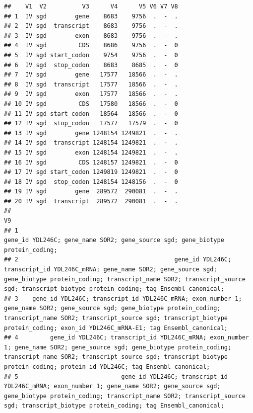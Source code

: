 \documentclass[
]{book}
\begin{document}
\begin{verbatim}
##    V1  V2          V3      V4      V5 V6 V7 V8
## 1  IV sgd        gene    8683    9756  .  -  .
## 2  IV sgd  transcript    8683    9756  .  -  .
## 3  IV sgd        exon    8683    9756  .  -  .
## 4  IV sgd         CDS    8686    9756  .  -  0
## 5  IV sgd start_codon    9754    9756  .  -  0
## 6  IV sgd  stop_codon    8683    8685  .  -  0
## 7  IV sgd        gene   17577   18566  .  -  .
## 8  IV sgd  transcript   17577   18566  .  -  .
## 9  IV sgd        exon   17577   18566  .  -  .
## 10 IV sgd         CDS   17580   18566  .  -  0
## 11 IV sgd start_codon   18564   18566  .  -  0
## 12 IV sgd  stop_codon   17577   17579  .  -  0
## 13 IV sgd        gene 1248154 1249821  .  -  .
## 14 IV sgd  transcript 1248154 1249821  .  -  .
## 15 IV sgd        exon 1248154 1249821  .  -  .
## 16 IV sgd         CDS 1248157 1249821  .  -  0
## 17 IV sgd start_codon 1249819 1249821  .  -  0
## 18 IV sgd  stop_codon 1248154 1248156  .  -  0
## 19 IV sgd        gene  289572  290081  .  -  .
## 20 IV sgd  transcript  289572  290081  .  -  .
##                                                                                                                                                                                                                                                             V9
## 1                                                                                                                                                                               gene_id YDL246C; gene_name SOR2; gene_source sgd; gene_biotype protein_coding;
## 2                                            gene_id YDL246C; transcript_id YDL246C_mRNA; gene_name SOR2; gene_source sgd; gene_biotype protein_coding; transcript_name SOR2; transcript_source sgd; transcript_biotype protein_coding; tag Ensembl_canonical;
## 3    gene_id YDL246C; transcript_id YDL246C_mRNA; exon_number 1; gene_name SOR2; gene_source sgd; gene_biotype protein_coding; transcript_name SOR2; transcript_source sgd; transcript_biotype protein_coding; exon_id YDL246C_mRNA-E1; tag Ensembl_canonical;
## 4         gene_id YDL246C; transcript_id YDL246C_mRNA; exon_number 1; gene_name SOR2; gene_source sgd; gene_biotype protein_coding; transcript_name SOR2; transcript_source sgd; transcript_biotype protein_coding; protein_id YDL246C; tag Ensembl_canonical;
## 5                             gene_id YDL246C; transcript_id YDL246C_mRNA; exon_number 1; gene_name SOR2; gene_source sgd; gene_biotype protein_coding; transcript_name SOR2; transcript_source sgd; transcript_biotype protein_coding; tag Ensembl_canonical;

\end{verbatim}
\end{document}
